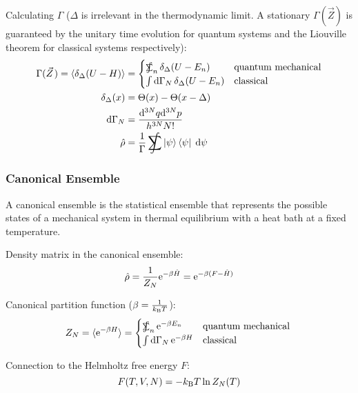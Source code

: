 			\noindent
			Calculating $\Gamma$ ($\Delta$ is irrelevant in the thermodynamic limit. A stationary $\Gamma(\vec{Z})$ is guaranteed by the unitary time evolution for quantum systems and the Liouville theorem for classical systems respectively):
			\begin{equation}
				\begin{aligned}
					\Gamma(\vec{Z}) = \langle \delta_\Delta (U-H) \rangle
						&= \begin{cases}
								\SumInt_n \delta_\Delta(U-E_n) & \text{quantum mechanical} \\
								\int \dd \Gamma_N \, \delta_\Delta(U-E_n) & \text{classical}
							\end{cases} \\
					\delta_\Delta(x) &= \Theta(x) - \Theta(x-\Delta)\\
					\dd \Gamma_N &= \frac{\dd^{3N}q \dd^{3N}p }{h^{3N} N!} \\
					\hat{\rho} &= \frac{1}{\Gamma} \SumInt \Ket{\psi}\Bra{\psi}\;\dd\psi
				\end{aligned}
			\end{equation}
			
			\subsubsection{Canonical Ensemble}
			A canonical ensemble is the statistical ensemble that represents the possible states of a mechanical system in thermal equilibrium with a heat bath at a fixed temperature.

			Density matrix in the canonical ensemble:
			\begin{equation}
				\hat{\rho} = \frac{1}{Z_N} \mathrm{e}^{-\beta \hat{H}} = \mathrm{e}^{-\beta (F-\hat{H})}
			\end{equation}

			\noindent
			Canonical partition function ($\beta = \frac{1}{k_{\text{B}} T}$):
			\begin{equation}
				Z_N=\langle \ex^{-\beta H} \rangle
					= \begin{cases}
							\SumInt_n \ex^{-\beta E_n} & \text{quantum mechanical} \\
							\int \dd \Gamma_N \, \ex^{-\beta H} & \text{classical}
						\end{cases} \\
			\end{equation}

			\noindent
			Connection to the Helmholtz free energy $F$:
			\begin{equation}
				F(T, V, N) = -k_{\text{B}} T \ln{Z_N(T)}
			\end{equation}

